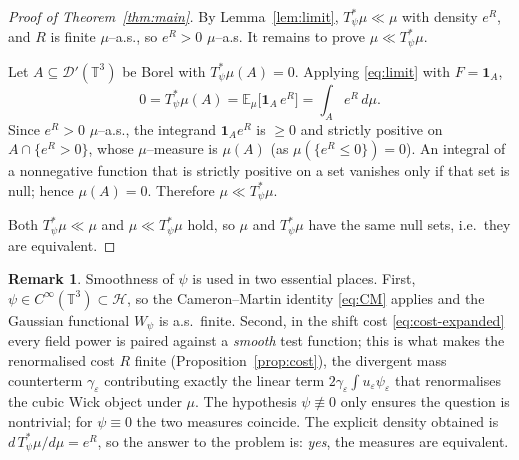 \documentclass[12pt]{article}
\theoremstyle{definition}
\newtheorem{remark}{Remark}
\newcommand{\T}{\mathbb{T}^3}
\newcommand{\E}{\mathbb{E}}
\newcommand{\D}{\mathcal{D}'(\T)}
\begin{document}
\begin{proof}[Proof of Theorem~\ref{thm:main}]
By Lemma~\ref{lem:limit}, $T_\psi^{*}\mu\ll\mu$ with density $e^{R}$, and $R$ is finite
$\mu$--a.s., so $e^{R}>0$ $\mu$--a.s. It remains to prove $\mu\ll T_\psi^{*}\mu$.

Let $A\subseteq\D$ be Borel with $T_\psi^{*}\mu(A)=0$. Applying \eqref{eq:limit} with
$F=\mathbf 1_A$,
\[
  0=T_\psi^{*}\mu(A)=\E_\mu\!\big[\mathbf 1_A\,e^{R}\big]=\int_A e^{R}\,d\mu .
\]
Since $e^{R}>0$ $\mu$--a.s., the integrand $\mathbf 1_A e^{R}$ is $\ge0$ and strictly
positive on $A\cap\{e^R>0\}$, whose $\mu$--measure is $\mu(A)$ (as $\mu(\{e^R\le0\})=0$).
An integral of a nonnegative function that is strictly positive on a set vanishes only if
that set is null; hence $\mu(A)=0$. Therefore $\mu\ll T_\psi^{*}\mu$.

Both $T_\psi^{*}\mu\ll\mu$ and $\mu\ll T_\psi^{*}\mu$ hold, so $\mu$ and $T_\psi^{*}\mu$
have the same null sets, i.e.\ they are equivalent.
\end{proof}

\begin{remark}
Smoothness of $\psi$ is used in two essential places. First, $\psi\in C^\infty(\T)\subset\mathcal H$,
so the Cameron--Martin identity \eqref{eq:CM} applies and the Gaussian functional $W_\psi$
is a.s.\ finite. Second, in the shift cost \eqref{eq:cost-expanded} every field power is
paired against a \emph{smooth} test function; this is what makes the renormalised cost $R$
finite (Proposition~\ref{prop:cost}), the divergent mass counterterm $\gamma_\varepsilon$
contributing exactly the linear term $2\gamma_\varepsilon\int u_\varepsilon\psi_\varepsilon$
that renormalises the cubic Wick object under $\mu$. The hypothesis $\psi\not\equiv0$ only
ensures the question is nontrivial; for $\psi\equiv0$ the two measures coincide. The
explicit density obtained is $d\,T_\psi^{*}\mu/d\mu=e^{R}$, so the answer to the problem is:
\emph{yes}, the measures are equivalent.
\end{remark}
\end{document}
